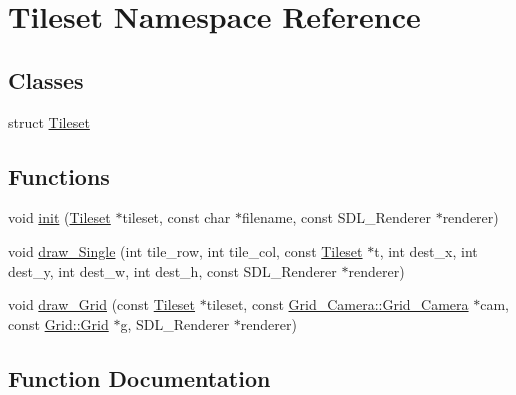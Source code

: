 \hypertarget{namespace_tileset}{}\section{Tileset Namespace Reference}
\label{namespace_tileset}
\subsection*{Classes}
\begin{DoxyCompactItemize}
\item 
struct \mbox{\hyperlink{struct_tileset_1_1_tileset}{Tileset}}
\end{DoxyCompactItemize}
\subsection*{Functions}
\begin{DoxyCompactItemize}
\item 
void \mbox{\hyperlink{namespace_tileset_a4daa4d4b2aa9fc60b65c1735bd7b6323}{init}} (\mbox{\hyperlink{struct_tileset_1_1_tileset}{Tileset}} $\ast$tileset, const char $\ast$filename, const S\+D\+L\+\_\+\+Renderer $\ast$renderer)
\item 
void \mbox{\hyperlink{namespace_tileset_acbff0eb5232585b9d7f9c82249c1312b}{draw\+\_\+\+Single}} (int tile\+\_\+row, int tile\+\_\+col, const \mbox{\hyperlink{struct_tileset_1_1_tileset}{Tileset}} $\ast$t, int dest\+\_\+x, int dest\+\_\+y, int dest\+\_\+w, int dest\+\_\+h, const S\+D\+L\+\_\+\+Renderer $\ast$renderer)
\item 
void \mbox{\hyperlink{namespace_tileset_ad123056dfb43fd2a41ea4c23b1fad9f3}{draw\+\_\+\+Grid}} (const \mbox{\hyperlink{struct_tileset_1_1_tileset}{Tileset}} $\ast$tileset, const \mbox{\hyperlink{struct_grid___camera_1_1_grid___camera}{Grid\+\_\+\+Camera\+::\+Grid\+\_\+\+Camera}} $\ast$cam, const \mbox{\hyperlink{struct_grid_1_1_grid}{Grid\+::\+Grid}} $\ast$g, S\+D\+L\+\_\+\+Renderer $\ast$renderer)
\end{DoxyCompactItemize}


\subsection{Function Documentation}
\mbox{\label{namespace_tileset_ad123056dfb43fd2a41ea4c23b1fad9f3}} 
